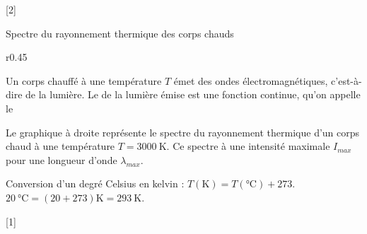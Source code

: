[2]


\newpage\vspace*{-36pt}
\begin{doc}{Spectre du rayonnement thermique des corps chauds}
  \begin{wrapfigure}[5]{r}{0.45\linewidth}
    \vspace*{-20pt}
    \centering
  \end{wrapfigure}
  \strut\vspace*{-22pt}
  
  \begin{importants}  
    Un corps chauffé à une température $T$ émet des ondes électromagnétiques, c'est-à-dire de la lumière.
    Le  de la lumière émise est une fonction continue, qu'on appelle le 
  \end{importants}

  Le graphique à droite représente le spectre du rayonnement thermique d'un corps chaud à une température $T = \qty{3000}{\kelvin}$.
  Ce spectre à une intensité maximale $I_{max}$ pour une longueur d'onde $\lambda_{max}$.
  \medskip

  \begin{importants}
    Conversion d'un degré Celsius en kelvin :
    $T(\unit{\kelvin}) = T(\unit{\degreeCelsius}) + 273$. 
    \exemple $\qty{20}{\degreeCelsius} = (20 + 273) \unit{\kelvin} = \qty{293}{\kelvin}$.
  \end{importants}
\end{doc}

[1]

